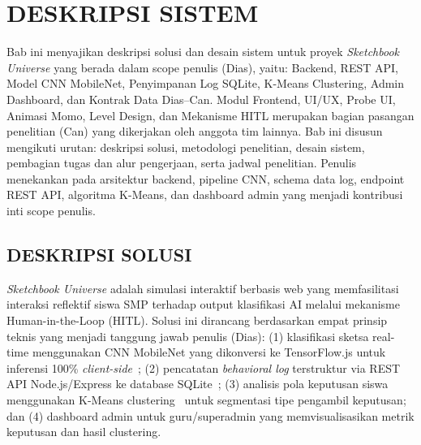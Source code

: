 \documentclass[12pt,a4paper,oneside,openany]{report}
\begin{document}
\chapter{DESKRIPSI SISTEM}
\label{chap:bab3}

Bab ini menyajikan deskripsi solusi dan desain sistem untuk proyek \textit{Sketchbook Universe} yang berada dalam scope penulis (Dias), yaitu: Backend, REST API, Model CNN MobileNet, Penyimpanan Log SQLite, K-Means Clustering, Admin Dashboard, dan Kontrak Data Dias--Can. Modul Frontend, UI/UX, Probe UI, Animasi Momo, Level Design, dan Mekanisme HITL merupakan bagian pasangan penelitian (Can) yang dikerjakan oleh anggota tim lainnya. Bab ini disusun mengikuti urutan: deskripsi solusi, metodologi penelitian, desain sistem, pembagian tugas dan alur pengerjaan, serta jadwal penelitian. Penulis menekankan pada arsitektur backend, pipeline CNN, schema data log, endpoint REST API, algoritma K-Means, dan dashboard admin yang menjadi kontribusi inti scope penulis.

\section{DESKRIPSI SOLUSI}
\label{sec:deskripsi-solusi}

\textit{Sketchbook Universe} adalah simulasi interaktif berbasis web yang memfasilitasi interaksi reflektif siswa SMP terhadap output klasifikasi AI melalui mekanisme Human-in-the-Loop (HITL). Solusi ini dirancang berdasarkan empat prinsip teknis yang menjadi tanggung jawab penulis (Dias): (1) klasifikasi sketsa real-time menggunakan CNN MobileNet yang dikonversi ke TensorFlow.js untuk inferensi 100\% \textit{client-side}~\cite{ref6}\cite{ref7}\cite{ref8}; (2) pencatatan \textit{behavioral log} terstruktur via REST API Node.js/Express ke database SQLite~\cite{ref4}; (3) analisis pola keputusan siswa menggunakan K-Means clustering~\cite{ref10}\cite{ref11} untuk segmentasi tipe pengambil keputusan; dan (4) dashboard admin untuk guru/superadmin yang memvisualisasikan metrik keputusan dan hasil clustering.
\end{document}
